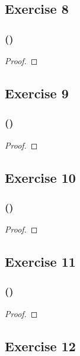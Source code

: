 \documentclass[14pt]{extarticle}
\begin{document}
\subsection{Exercise 8}

\subsubsection{()}

\begin{proof}

\end{proof}

\subsection{Exercise 9}

\subsubsection{()}

\begin{proof}

\end{proof}

\subsection{Exercise 10}

\subsubsection{()}

\begin{proof}

\end{proof}

\subsection{Exercise 11}

\subsubsection{()}

\begin{proof}

\end{proof}

\subsection{Exercise 12}
\end{document}
